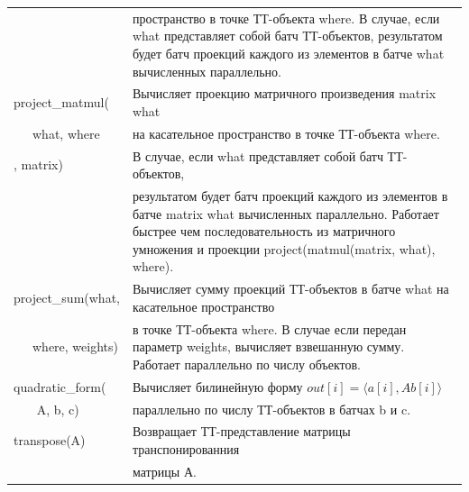 \begin{longtable}[c]{ll}
& пространство в точке ТТ-объекта where. В случае, если what представляет собой батч ТТ-объектов, результатом будет батч проекций каждого из элементов в батче what вычисленных параллельно.\\
project\_matmul( & Вычисляет проекцию матричного произведения matrix what \\
~~~what, where & на касательное пространство в точке ТТ-объекта where. \\
, matrix) & В случае, если what представляет собой батч ТТ-объектов, \\
& результатом будет батч проекций каждого из элементов в батче matrix what вычисленных параллельно. Работает быстрее чем последовательность из матричного умножения и проекции project(matmul(matrix, what), where).\\
project\_sum(what, & Вычисляет сумму проекций ТТ-объектов в батче what на касательное пространство\\
~~~where, weights) & в точке ТТ-объекта where. В случае если передан параметр weights, вычисляет взвешанную сумму. Работает параллельно по числу объектов.\\
\alert{quadratic\_form}( & Вычисляет билинейную форму $out[i] = \langle a[i], A b[i] \rangle$\\
~~~ A, b, c) & параллельно по числу ТТ-объектов в батчах b и c.\\
transpose(A) & Возвращает ТТ-представление матрицы транспонированния \\
& матрицы А.\\
\end{longtable}







